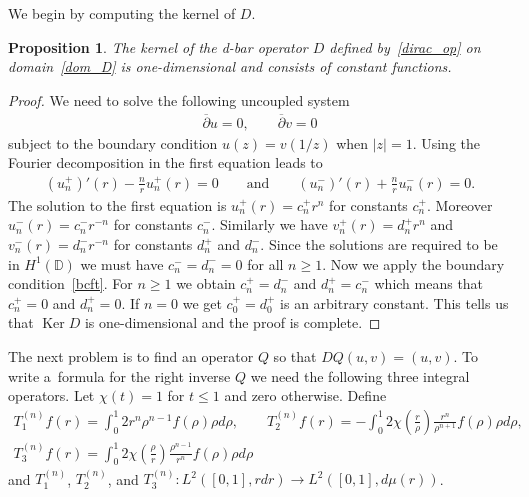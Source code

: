 \documentclass[pdftex]{sigma}
\numberwithin{equation}{section}
\newtheorem{prop}[theo]{Proposition}
{\theoremstyle{definition}
\newtheorem{rem}[theo]{Remark}
\newtheorem{defin}[theo]{Definition}
}
\DeclareMathOperator{\Ker}{Ker}
\begin{document}
We begin by computing the kernel of $D$.

\begin{prop}
The kernel of the d-bar operator $D$ defined by~\eqref{dirac_op} on domain~\eqref{dom_D} is one-dimensional and consists
of constant functions.
\end{prop}

\begin{proof}
We need to solve the following uncoupled system
\begin{gather*}
\overline{\partial}u = 0,
\qquad
\overline{\partial}v = 0
\end{gather*}
subject to the boundary condition $u(z)=v(1/z)$ when $|z|=1$.
Using the Fourier decomposition in the f\/irst equation leads to
\begin{gather*}
(u_n^+)'(r) - \frac{n}{r} u_n^+(r) = 0
\qquad
\textrm{and}
\qquad
(u_n^-)'(r) + \frac{n}{r} u_n^-(r) = 0.
\end{gather*}
The solution to the f\/irst equation is $u_n^+(r) = c_n^+ r^n$ for constants $c_n^+$.
Moreover $u_n^-(r) = c_n^-r^{-n}$ for constants $c_n^-$.
Similarly we have $v_n^+(r) = d_n^+r^n$ and $v_n^-(r) = d_n^-r^{-n}$ for constants $d_n^+$ and $d_n^-$.
Since the solutions are required to be in $H^1({\mathbb D})$ we must have $c_n^- = d_n^- = 0$ for all $n\ge 1$.
Now we apply the boundary condition~\eqref{bcft}.
For $n\ge1$ we obtain $c_n^+ = d_n^-$ and $d_n^+ = c_n^-$ which means that $c_n^+ = 0$ and $d_n^+ = 0$.
If $n=0$ we get $c_0^+=d_0^+$ is an arbitrary constant.
This tells us that $\Ker D$ is one-dimensional and the proof is complete.
\end{proof}

The next problem is to f\/ind an operator $Q$ so that $DQ(u,v)=(u,v)$.
To write a~formula for the right inverse $Q$ we need the following three integral operators.
Let $\chi(t)=1$ for $t\le1$ and zero otherwise.
Def\/ine
\begin{gather}
T_1^{(n)}f(r) = \int_0^1 2r^n\rho^{n-1}f(\rho)\rho d\rho,
\qquad
T_2^{(n)}f(r) = -\int_0^1 2\chi\left(\frac{r}{\rho}\right)\frac{r^n}{\rho^{n+1}}f(\rho)\rho d\rho,
\nonumber
\\
T_3^{(n)}f(r) = \int_0^1 2\chi\left(\frac{\rho}{r}\right)\frac{\rho^{n-1}}{r^n}f(\rho)\rho d\rho
\label{int_ops_cont}
\end{gather}
and $T_1^{(n)}$, $T_2^{(n)}$, and $T_3^{(n)}: L^2([0,1], rdr)\to L^2([0,1], d\mu(r))$.
\end{document}
